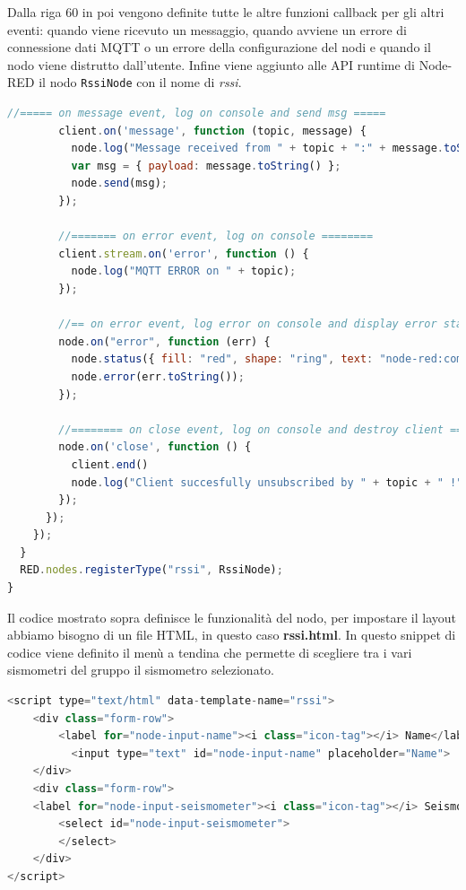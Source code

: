 \documentclass[a4paper,10pt]{memoir}
\begin{document}
Dalla riga 60 in poi vengono definite tutte le altre funzioni callback per gli altri eventi: quando viene ricevuto un messaggio, quando avviene un errore di connessione dati MQTT o un errore della configurazione del nodi e quando il nodo viene distrutto dall'utente. Infine viene aggiunto alle API runtime di Node-RED il nodo \texttt{RssiNode} con il nome di \textit{rssi}.
\begin{lstlisting}[language=Javascript,firstnumber=60]
        //===== on message event, log on console and send msg =====
        client.on('message', function (topic, message) {
          node.log("Message received from " + topic + ":" + message.toString());
          var msg = { payload: message.toString() };
          node.send(msg);
        });

        //======= on error event, log on console ========
        client.stream.on('error', function () {
          node.log("MQTT ERROR on " + topic);
        });

        //== on error event, log error on console and display error status ==
        node.on("error", function (err) {
          node.status({ fill: "red", shape: "ring", text: "node-red:common.status.error" });
          node.error(err.toString());
        });

        //======== on close event, log on console and destroy client ========
        node.on('close', function () {
          client.end()
          node.log("Client succesfully unsubscribed by " + topic + " !");
        });
      });
    });
  }
  RED.nodes.registerType("rssi", RssiNode);
}
\end{lstlisting}
\clearpage

Il codice mostrato sopra definisce le funzionalità del nodo, per impostare il layout abbiamo bisogno di un file HTML, in questo caso \textbf{rssi.html}.
In questo snippet di codice viene definito il menù a tendina che permette di scegliere tra i vari sismometri del gruppo il sismometro selezionato.
\begin{lstlisting}[language=Javascript,firstnumber=45]
<script type="text/html" data-template-name="rssi">
    <div class="form-row">
        <label for="node-input-name"><i class="icon-tag"></i> Name</label>
          <input type="text" id="node-input-name" placeholder="Name">
    </div>
    <div class="form-row">
    <label for="node-input-seismometer"><i class="icon-tag"></i> Seismometer</label>
        <select id="node-input-seismometer">
        </select>
    </div>
</script>
\end{lstlisting}
\end{document}
